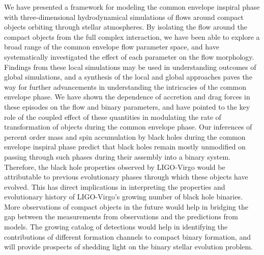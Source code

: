 We have presented a framework for modeling the common envelope inspiral phase with three-dimensional hydrodynamical simulations of flows around compact objects orbiting through stellar atmospheres. By isolating the flow around the compact objects from the full complex interaction, we have been able to explore a broad range of the common envelope flow parameter space, and have systematically investigated the effect of each parameter on the flow morphology. Findings from these local simulations may be used in understanding outcomes of global simulations, and a synthesis of the local and global approaches paves the way for further advancements in understanding the intricacies of the common envelope phase. We have shown the dependence of accretion and drag forces in these episodes on the flow and binary parameters, and have pointed to the key role of the coupled effect of these quantities in modulating the rate of transformation of objects during the common envelope phase. Our inferences of percent order mass and spin accumulation by black holes during the common envelope inspiral phase predict that black holes remain mostly unmodified on passing through such phases during their assembly into a binary system. Therefore, the black hole properties observed by LIGO-Virgo would be attributable to previous evolutionary phases through which these objects have evolved. This has direct implications in interpreting the properties and evolutionary history of LIGO-Virgo's growing number of black hole binaries. More observations of compact objects in the future would help in bridging the gap between the measurements from observations and the predictions from models. The growing catalog of detections would help in identifying the contributions of different formation channels to compact binary formation, and will provide prospects of shedding light on the binary stellar evolution problem.


